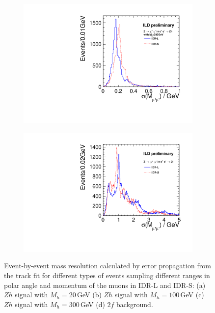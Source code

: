 \begin{figure}[htbp]
\begin{subfigure}{0.475\hsize}
\includegraphics[width=\textwidth]{Performance/fig/lepton_pair_inm_sigma_nh300.pdf}
 \caption{ \label{fig:extraH:Msigma:mh300}}
 \end{subfigure}
\begin{subfigure}{0.475\hsize} 
\includegraphics[width=\textwidth]{Performance/fig/lepton_pair_inm_sigma_2f.pdf}
 \caption{  \label{fig:extraH:Msigma:2f}}
 \end{subfigure}
\caption{Event-by-event mass resolution calculated by error propagation from the track fit for different types of events sampling different ranges in polar angle and momentum of the muons in IDR-L and IDR-S:
(a) $Zh$ signal with $M_h = 20$\,GeV
(b) $Zh$ signal with $M_h = 100$\,GeV
(c) $Zh$ signal with $M_h = 300$\,GeV
(d) $2f$ background.
}
\label{fig:extraH:Msigma}
\end{figure}

